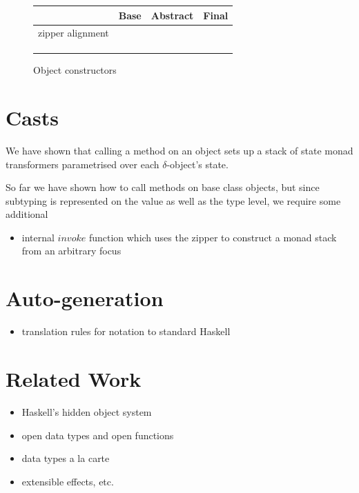 \documentclass[runningheads,a4paper]{llncs}
\begin{document}
\begin{figure}
\begin{center}
\begin{tabular}{|c|c|c|c|}
\hline  & Base & Abstract & Final \\ 
\hline zipper alignment &  &  &  \\ 
\hline  &  &  &  \\ 
\hline  &  &  &  \\ 
\hline  &  &  &  \\ 
\hline 
\end{tabular} 
\end{center}

\caption{Object constructors}\label{tab:constructors}
\end{figure}

\section{Casts}
\label{sec:casts}

We have shown that calling a method on an object sets up a stack of state monad transformers parametrised over each $\delta$-object's state.

So far we have shown how to call methods on base class objects, but since subtyping is represented on the value as well as the type level, we require some additional 

\begin{itemize}
\item internal $\mathit{invoke}$ function which uses the zipper to construct a monad stack from an arbitrary focus
\end{itemize}

\section{Auto-generation}
\label{sec:auto}

\begin{itemize}
\item translation rules for notation to standard Haskell
\end{itemize}

\section{Related Work}
\label{sec:related}

\begin{itemize}
\item Haskell's hidden object system
\item open data types and open functions
\item data types a la carte
\item extensible effects, etc.
\end{itemize}
\end{document}

